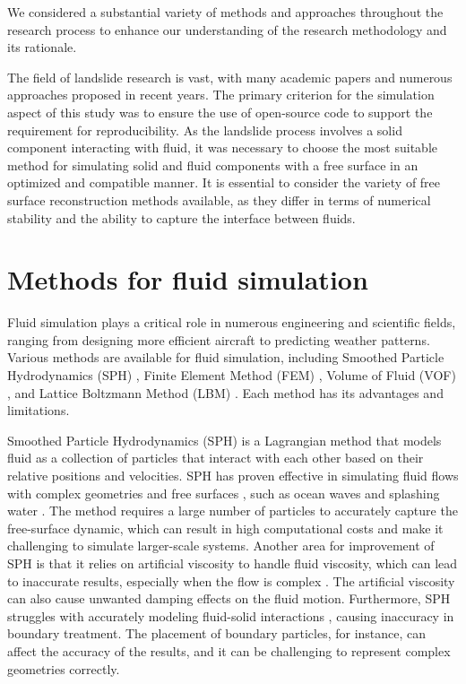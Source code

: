 We considered a substantial variety of methods and approaches throughout the research process to enhance our understanding of the research methodology and its rationale.

The field of landslide research is vast, with many academic papers and numerous approaches proposed in recent years. The primary criterion for the simulation aspect of this study was to ensure the use of open-source code to support the requirement for reproducibility. As the landslide process involves a solid component interacting with fluid, it was necessary to choose the most suitable method for simulating solid and fluid components with a free surface in an optimized and compatible manner. It is essential to consider the variety of free surface reconstruction methods available, as they differ in terms of numerical stability and the ability to capture the interface between fluids.

\section{Methods for fluid simulation}

Fluid simulation plays a critical role in numerous engineering and scientific fields, ranging from designing more efficient aircraft to predicting weather patterns. Various methods are available for fluid simulation, including Smoothed Particle Hydrodynamics (SPH) \cite{monaghan1994SPH} \cite{gingold1977SPH}, Finite Element Method (FEM) \cite{lewis2004fundamentals}, Volume of Fluid (VOF) \cite{hirt1981volume}, and Lattice Boltzmann Method (LBM) \cite{chen1998lattice}. Each method has its advantages and limitations.

Smoothed Particle Hydrodynamics (SPH) is a Lagrangian method that models fluid as a collection of particles that interact with each other based on their relative positions and velocities. SPH has proven effective in simulating fluid flows with complex geometries and free surfaces \cite{adami2012SPH}, such as ocean waves \cite{barreiro2013SPH} and splashing water \cite{moreira2020SPH}. The method requires a large number of particles to accurately capture the free-surface dynamic, which can result in high computational costs and make it challenging to simulate larger-scale systems. Another area for improvement of SPH is that it relies on artificial viscosity to handle fluid viscosity, which can lead to inaccurate results, especially when the flow is complex \cite{zhang2018dualsphysics}. The artificial viscosity can also cause unwanted damping effects on the fluid motion. Furthermore, SPH struggles with accurately modeling fluid-solid interactions \cite{Dual_SPH2019accuracy}, causing inaccuracy in boundary treatment. The placement of boundary particles, for instance, can affect the accuracy of the results, and it can be challenging to represent complex geometries correctly.

